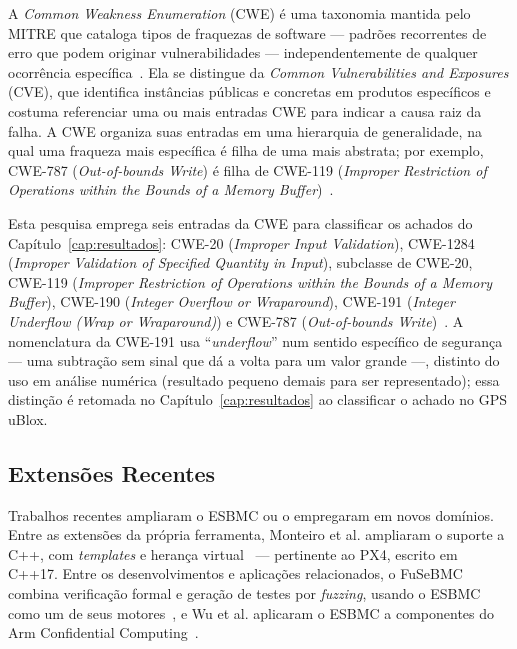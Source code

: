 A \textit{Common Weakness Enumeration} (CWE) é uma taxonomia mantida pelo MITRE
que cataloga tipos de fraquezas de software --- padrões recorrentes de erro que
podem originar vulnerabilidades --- independentemente de qualquer ocorrência
específica~\cite{MITRE_CWE}. Ela se distingue da \textit{Common Vulnerabilities
and Exposures} (CVE), que identifica instâncias públicas e concretas em produtos
específicos e costuma referenciar uma ou mais entradas CWE para indicar a causa
raiz da falha. A CWE organiza suas entradas em uma hierarquia de generalidade, na
qual uma fraqueza mais específica é filha de uma mais abstrata; por exemplo,
CWE-787 (\textit{Out-of-bounds Write}) é filha de CWE-119 (\textit{Improper
Restriction of Operations within the Bounds of a Memory Buffer})~\cite{MITRE_CWE}.

Esta pesquisa emprega seis entradas da CWE para classificar os achados do
Capítulo~\ref{cap:resultados}: CWE-20 (\textit{Improper Input Validation}),
CWE-1284 (\textit{Improper Validation of Specified Quantity in Input}), subclasse
de CWE-20, CWE-119 (\textit{Improper Restriction of Operations within the Bounds of
a Memory Buffer}), CWE-190 (\textit{Integer Overflow or Wraparound}), CWE-191
(\textit{Integer Underflow (Wrap or Wraparound)}) e CWE-787 (\textit{Out-of-bounds
Write})~\cite{MITRE_CWE}. A nomenclatura da CWE-191 usa ``\textit{underflow}'' num
sentido específico de segurança --- uma subtração sem sinal que dá a volta para um
valor grande ---, distinto do uso em análise numérica (resultado pequeno demais
para ser representado); essa distinção é retomada no
Capítulo~\ref{cap:resultados} ao classificar o achado no GPS uBlox.

\subsection{Extensões Recentes}

Trabalhos recentes ampliaram o ESBMC ou o empregaram em novos domínios. Entre as
extensões da própria ferramenta, Monteiro et al. ampliaram o suporte a C++, com
\textit{templates} e herança virtual~\cite{Monteiro2022} --- pertinente ao PX4,
escrito em C++17. Entre os desenvolvimentos e aplicações relacionados, o FuSeBMC
combina verificação formal e geração de testes por \textit{fuzzing}, usando o ESBMC
como um de seus motores~\cite{Alshmrany2022}, e Wu et al. aplicaram o ESBMC a
componentes do Arm Confidential Computing~\cite{Wu2024}.


